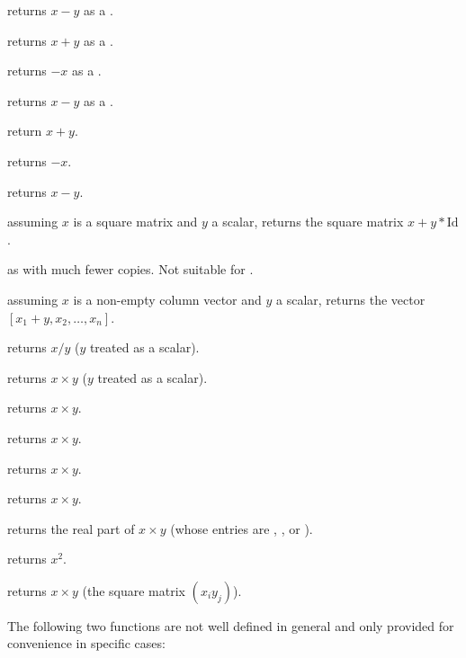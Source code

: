  returns $x - y$ as a .

 returns $x + y$ as a .

 returns $-x$ as a .

 returns $x - y$ as a .

 return $x+y$.

 returns $-x$.

 returns $x-y$.

 assuming $x$ is a square matrix
and $y$ a scalar, returns the square matrix $x + y*\text{Id}$.

 as  with much
fewer copies. Not suitable for .

 assuming $x$ is a non-empty column vector
and $y$ a scalar, returns the vector $[x_1 + y, x_2,\dots,x_n]$.


 returns $x/y$ ($y$ treated as a scalar).



 returns $x\times y$ ($y$ treated as a
scalar).

 returns $x\times y$.

 returns $x\times y$.

 returns $x\times y$.

 returns $x\times y$.

 returns the real part of $x\times y$
(whose entries are , ,  or ).

 returns $x^2$.

 returns $x\times y$ (the square matrix
$(x_iy_j)$).

The following two functions are not well defined in general and only provided
for convenience in specific cases:

